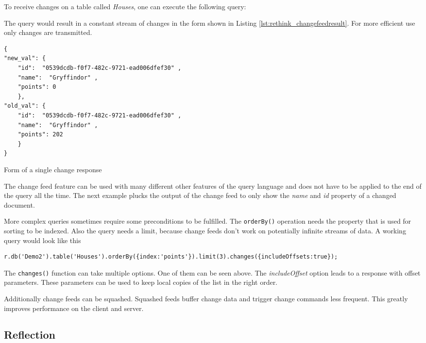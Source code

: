 To receive changes on a table called \textit{Houses}, one can execute the following query:

The query would result in a constant stream of changes in the form shown in Listing \autoref{lst:rethink_changefeedresult}. For more efficient use only changes are transmitted.

\begin{listing}[H]
\begin{verbatim}
{
"new_val": {
    "id":  "0539dcdb-f0f7-482c-9721-ead006dfef30" ,
    "name":  "Gryffindor" ,
    "points": 0
    },
"old_val": {
    "id":  "0539dcdb-f0f7-482c-9721-ead006dfef30" ,
    "name":  "Gryffindor" ,
    "points": 202
    }
}
\end{verbatim}
\caption{Form of a single change response}
\label{lst:rethink_changefeedresult}
\end{listing}

The change feed feature can be used with many different other features of the query language and does not have to be applied to the end of the query all the time. The next example plucks the output of the change feed to only show the \textit{name} and \textit{id} property of a changed document.

More complex queries sometimes require some preconditions to be fulfilled. The \texttt{orderBy()} operation needs the property that is used for sorting to be indexed. Also the query needs a limit, because change feeds don't work on potentially infinite streams of data. A working query would look like this
\begin{verbatim}
r.db('Demo2').table('Houses').orderBy({index:'points'}).limit(3).changes({includeOffsets:true});
\end{verbatim}

The \texttt{changes()} function can take multiple options. One of them can be seen above. The \textit{includeOffset} option leads to a response with offset parameters. These parameters can be used to keep local copies of the list in the right order.


Additionally change feeds can be squashed. Squashed feeds buffer change data and trigger change commands less frequent. This greatly improves performance on the client and server.

\subsection{Reflection}

